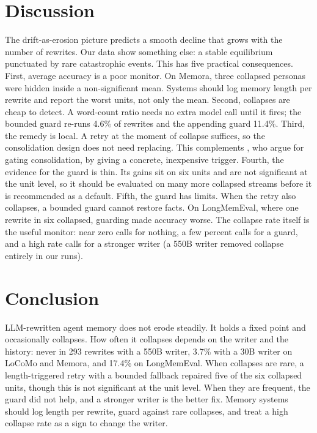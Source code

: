 \documentclass[11pt]{article}
\begin{document}
\section{Discussion}
The drift-as-erosion picture predicts a smooth decline that grows with the number of rewrites. Our data show something else: a stable equilibrium punctuated by rare catastrophic events. This has five practical consequences. First, average accuracy is a poor monitor. On Memora, three collapsed personas were hidden inside a non-significant mean. Systems should log memory length per rewrite and report the worst units, not only the mean. Second, collapses are cheap to detect. A word-count ratio needs no extra model call until it fires; the bounded guard re-runs 4.6\% of rewrites and the appending guard 11.4\%. Third, the remedy is local. A retry at the moment of collapse suffices, so the consolidation design does not need replacing. This complements \citet{zhang2026faulty}, who argue for gating consolidation, by giving a concrete, inexpensive trigger. Fourth, the evidence for the guard is thin. Its gains sit on six units and are not significant at the unit level, so it should be evaluated on many more collapsed streams before it is recommended as a default. Fifth, the guard has limits. When the retry also collapses, a bounded guard cannot restore facts. On LongMemEval, where one rewrite in six collapsed, guarding made accuracy worse. The collapse rate itself is the useful monitor: near zero calls for nothing, a few percent calls for a guard, and a high rate calls for a stronger writer (a 550B writer removed collapse entirely in our runs).

\section{Conclusion}
LLM-rewritten agent memory does not erode steadily. It holds a fixed point and occasionally collapses. How often it collapses depends on the writer and the history: never in 293 rewrites with a 550B writer, 3.7\% with a 30B writer on LoCoMo and Memora, and 17.4\% on LongMemEval. When collapses are rare, a length-triggered retry with a bounded fallback repaired five of the six collapsed units, though this is not significant at the unit level. When they are frequent, the guard did not help, and a stronger writer is the better fix. Memory systems should log length per rewrite, guard against rare collapses, and treat a high collapse rate as a sign to change the writer.
\end{document}
